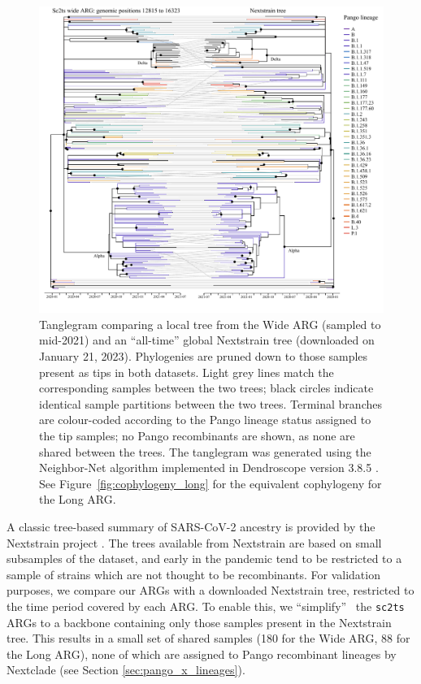 \documentclass{article}
\begin{document}
\begin{figure} \centering
\includegraphics[width=\textwidth]{figures/cophylogeny_wide.pdf}
\caption{\label{fig:cophylogeny}
Tanglegram comparing a local tree from the Wide ARG
(sampled to mid-2021) and an ``all-time'' global Nextstrain tree
(downloaded on January 21, 2023).
Phylogenies are pruned down to those samples present as tips in both datasets. Light grey
lines match the corresponding samples between the two trees; black circles
indicate identical sample partitions between the two trees. Terminal branches
are colour-coded according to the Pango lineage status assigned to the tip
samples; no Pango recombinants are shown, as none are shared between the trees.
The tanglegram was generated using the Neighbor-Net algorithm
\citep{Scornavacca2011-mg} implemented in Dendroscope version 3.8.5
\citep{Huson2012-ys}. See Figure~\ref{fig:cophylogeny_long} for the equivalent
cophylogeny for the Long ARG.}
\end{figure}

A classic tree-based summary of SARS-CoV-2 ancestry is provided
by the Nextstrain project \citep{Hadfield2018-ef}. The trees
available from Nextstrain are based on small subsamples of the
dataset, and early in the pandemic tend to be restricted to
a sample of strains which are not thought to be recombinants.
For validation purposes, we compare our ARGs with
a downloaded Nextstrain tree, restricted to the time period
covered by each ARG. To enable this, we ``simplify''~\citep{Kelleher2018-xc}
the \texttt{sc2ts} ARGs to a backbone containing only those samples
present in the Nextstrain tree. This results in a small set of shared
samples (180 for the Wide ARG, 88 for the Long ARG), none of which are
assigned to Pango recombinant lineages by Nextclade (see Section
\ref{sec:pango_x_lineages}).
\end{document}
